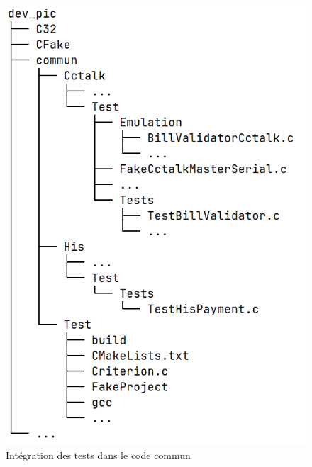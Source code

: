 \documentclass[a4paper]{article}
\begin{document}
\begin{figure}[h!]
  \begin{center}
    \includegraphics[scale=0.4]{./img/arborescence-commun.png}
    \caption{Intégration des tests dans le code commun}
    \label{fig:integrtestcommun}
  \end{center}
\end{figure}
\end{document}

